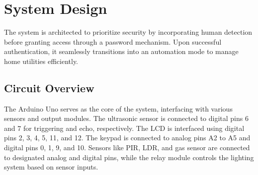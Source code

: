 \documentclass[a4paper,12pt]{article}
\begin{document}
\section{System Design}
The system is architected to prioritize security by incorporating human detection before granting access through a password mechanism. Upon successful authentication, it seamlessly transitions into an automation mode to manage home utilities efficiently.

\subsection{Circuit Overview}
The Arduino Uno serves as the core of the system, interfacing with various sensors and output modules. The ultrasonic sensor is connected to digital pins 6 and 7 for triggering and echo, respectively. The LCD is interfaced using digital pins 2, 3, 4, 5, 11, and 12. The keypad is connected to analog pins A2 to A5 and digital pins 0, 1, 9, and 10. Sensors like PIR, LDR, and gas sensor are connected to designated analog and digital pins, while the relay module controls the lighting system based on sensor inputs.
\end{document}
